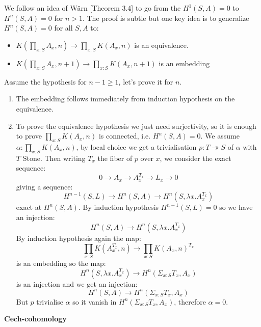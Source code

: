 \documentclass{../util/zariski}
\begin{document}
We follow an idea of Wärn \cite{cech-draft}[Theorem 3.4] to go from the $H^1(S,A)=0$ to $H^n(S,A)=0$ for $n>1$. The proof is subtle but one key idea is to generalize $H^n(S,A) = 0$ for all $S,A$ to: 
\begin{itemize}
\item $K(\prod_{x:S}A_x,n) \to \prod_{x:S}K(A_x,n)$ is an equivalence.
\item $K(\prod_{x:S}A_x,n+1) \to \prod_{x:S}K(A_x,n+1)$ is an embedding
\end{itemize}
Assume the hypothesis for $n-1\geq 1$, let's prove it for $n$.
\begin{enumerate}
\item The embedding follows immediately from induction hypothesis on the equivalence.
\item To prove the equivalence hypothesis we just need surjectivity, so it is enough to prove $\prod_{x:S}K(A_x,n)$ is connected, i.e. $H^n(S,A)=0$. We assume $\alpha:\prod_{x:S}K(A_x,n)$, by local choice we get a trivialisation $p:T\twoheadrightarrow S$ of $\alpha$ with $T$ Stone. Then writing $T_x$ the fiber of $p$ over $x$, we consider the exact sequence:
\[0\to A_x\to A_x^{T_x}\to L_x\to 0\]
giving a sequence:
\[H^{n-1}(S,L)\to H^n(S,A)\to H^n(S,\lambda x. A_x^{T_x})\]
exact at $H^n(S,A)$. By induction hypothesis $H^{n-1}(S,L) = 0$ so we have an injection:
\[H^n(S,A)\to H^n(S,\lambda x. A_x^{T_x})\]
By induction hypothesis again the map: 
\[\prod_{x:S}K(A_x^{T_x},n)\to \prod_{x:S}K(A_x,n)^{T_x}\]
is an embedding so the map:
\[H^n(S,\lambda x. A_x^{T_x}) \to H^n(\Sigma_{x:S}T_x,A_x)\]
is an injection and we get an injection:
\[H^n(S,A)\to H^n(\Sigma_{x:S}T_x,A_x)\] 
But $p$ trivialise $\alpha$ so it vanish in $H^n(\Sigma_{x:S}T_x,A_x)$, therefore $\alpha=0$.
\end{enumerate}

\textbf{Cech-cohomology}



\printbibliography
\end{document}
